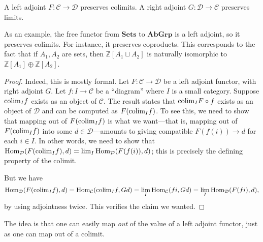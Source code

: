 \begin{proposition} \label{adjlimits}
A left adjoint $F: \mathcal{C} \to \mathcal{D}$ preserves colimits. A right
adjoint $G: \mathcal{D} \to \mathcal{C}$ preserves limits.
\end{proposition} 

As an example, the free functor from $\mathbf{Sets}$ to $\mathbf{AbGrp}$ is a
left adjoint, so it preserves colimits. For instance, it preserves coproducts.
This corresponds to the fact that if $A_1, A_2$ are sets, then $\mathbb{Z}[A_1
\sqcup A_2]$ is naturally isomorphic to $\mathbb{Z}[A_1] \oplus
\mathbb{Z}[A_2]$.

\begin{proof} 
Indeed, this is mostly formal. 
Let $F: \mathcal{C}\to \mathcal{D}$ be a left adjoint functor, with right
adjoint $G$.
Let $f: I \to \mathcal{C}$ be a ``diagram'' where $I$ is a small category. 
Suppose $\mathrm{colim}_I f$ exists as an object of $\mathcal{C}$. The result states
that $\mathrm{colim}_I F \circ f$ exists as an object of $\mathcal{D}$ and can be
computed as 
$F(\mathrm{colim}_I f)$.
To see this, we need to show that mapping out of $F(\mathrm{colim}_I f)$ is what we
want---that is, mapping out of $F(\mathrm{colim}_I f)$ into some $d \in \mathcal{D}$---amounts to
giving compatible $F(f(i)) \to d$ for each $i \in I$.
In other words, we need to show that $\operatorname{Hom}_{\mathcal{D}}( F(\mathrm{colim}_I f), d) =
\lim_I \operatorname{Hom}_{\mathcal{D}}(
F(f(i)), d)$; this is precisely the defining property of the colimit.

But we have
\[ \operatorname{Hom}_{\mathcal{D}}( F(\mathrm{colim}_I f  ), d) = \operatorname{Hom}_{\mathcal{C}}(\mathrm{colim}_I f, Gd)
= \lim_I \operatorname{Hom}_{\mathcal{C}}(fi, Gd) = \lim_I \operatorname{Hom}_{\mathcal{D}}(F(fi), d),
\]
by using adjointness twice. 
This verifies the claim we wanted.
\end{proof} 

The idea is that one can easily map \emph{out} of the value of a left adjoint
functor, just as one can map out of a colimit.



